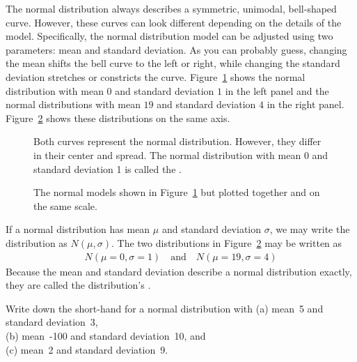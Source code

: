 The normal distribution always describes a symmetric, unimodal,
bell-shaped curve.
However, these curves can look different depending on the
details of the model.
Specifically, the normal distribution model can be adjusted
using two parameters: mean and standard deviation.
As you can probably guess, changing the mean shifts the bell
curve to the left or right, while changing the standard deviation
stretches or constricts the curve.
Figure~\ref{twoSampleNormals} shows the normal distribution
with mean $0$ and standard deviation $1$ in the left panel
and the normal distributions with mean $19$ and standard
deviation $4$ in the right panel.
Figure~\ref{twoSampleNormalsStacked} shows these distributions
on the same axis.

\begin{figure}[h]
  \centering
  \caption{Both curves represent the normal distribution.
      However, they differ in their center and spread.
      The normal distribution with mean 0 and standard
      deviation 1 is called the
      .}
  \label{twoSampleNormals}
\end{figure}

\begin{figure}[h]
  \centering
  \caption{The normal models shown in
      Figure~\ref{twoSampleNormals} but plotted together
      and on the same scale.}
  \label{twoSampleNormalsStacked}
\end{figure}

If a normal distribution has mean $\mu$ and standard deviation
$\sigma$, we may write the distribution as $N(\mu, \sigma)$.
The two distributions in Figure~\ref{twoSampleNormalsStacked}
may be written as
\begin{align*}
N(\mu=0,\sigma=1)
  \quad \text{and} \quad
  N(\mu=19,\sigma=4)
\end{align*}
Because the mean and standard deviation describe a normal
distribution exactly, they are called the distribution's
.

\begin{exercisewrap}
\begin{nexercise}
Write down the short-hand for a normal distribution
with\footnotemark{}
(a)
    mean~5 and standard deviation~3, \\
(b)
    mean~-100 and standard deviation~10, and \\
(c)
    mean~2 and standard deviation~9.
\end{nexercise}
\end{exercisewrap}


